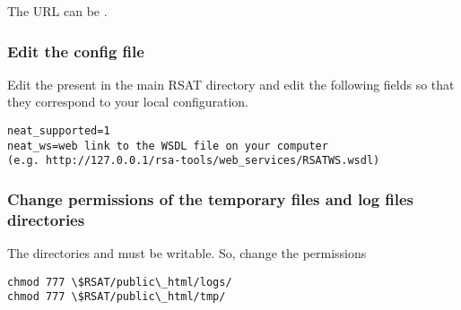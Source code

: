\documentclass{book}
\begin{document}
The URL can be .

\subsubsection{Edit the \neat config file}

Edit the  present in the main RSAT directory and edit the following fields so that they correspond to your local configuration.

\begin{footnotesize}
\begin{verbatim}
neat_supported=1
neat_ws=web link to the WSDL file on your computer
(e.g. http://127.0.0.1/rsa-tools/web_services/RSATWS.wsdl)
\end{verbatim}
\end{footnotesize}

\subsubsection{Change permissions of the temporary files and log files directories}

The directories  and  must be writable. So, change the permissions

\begin{footnotesize}
\begin{verbatim}
chmod 777 \$RSAT/public\_html/logs/
chmod 777 \$RSAT/public\_html/tmp/
\end{verbatim}
\end{footnotesize}
\end{document}
